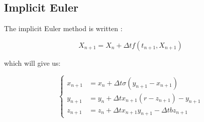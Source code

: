 \documentclass[12pt]{article}
\begin{document}
	\subsection{Implicit Euler}
	
	The implicit Euler method is written :
	
	$$X_{n+1}=X_n+\Delta t f(t_{n+1},X_{n+1})$$
	
	\noindent which will give us:
	
	$$\left\{\begin{aligned} 
		x_{n+1}&=x_n+\Delta t\sigma(y_{n+1}-x_{n+1}) \\
		y_{n+1}&=y_n+\Delta t x_{n+1}(r-z_{n+1})-y_{n+1} \\
		z_{n+1}&=z_n+\Delta tx_{n+1}y_{n+1}-\Delta tbz_{n+1}
	\end{aligned}\right.$$
	
\end{document}
